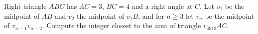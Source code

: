 Right triangle $ABC$ has $AC=3$, $BC=4$ and a right angle at $C$. Let $v_1$ be the midpoint of $AB$ and $v_2$ the midpoint of $v_1B$, and for $n\ge3$ let $v_n$ be the midpoint of $v_{n-1}v_{n-2}$. Compute the integer closest to the area of triangle $v_{4912}AC$.
